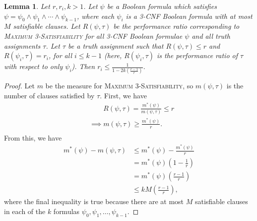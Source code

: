 \documentclass[]{article}
\theoremstyle{plain}
\newtheorem{lemma}{Lemma}
\theoremstyle{definition}
\begin{document}
\begin{lemma}\label{lem:bounds}
  Let $r, r_i, k > 1$.
  Let $\psi$ be a Boolean formula which satisfies $\psi = \psi_0 \land \psi_1 \land \dotsb \land \psi_{k - 1}$, where each $\psi_i$ is a 3-CNF Boolean formula with at most $M$ satisfiable clauses.
  Let $R(\psi, \tau)$ be the performance ratio corresponding to \textsc{Maximum 3-Satisfiability} for all 3-CNF Boolean formulae $\psi$ and all truth assignments $\tau$.
  Let $\tau$ be a truth assignment such that $R(\psi, \tau) \leq r$ and $R(\psi_i, \tau) = r_i$, for all $i \leq k - 1$ (here, $R(\psi_i, \tau)$ is the performance ratio of $\tau$ with respect to only $\psi_i$).
  Then $r_i \leq \frac{1}{1 - 2k\left(\frac{r - 1}{r}\right)}$.
\end{lemma}
\begin{proof}
  Let $m$ be the measure for \textsc{Maximum 3-Satisfiability}, so $m(\psi, \tau)$ is the number of clauses satisfied by $\tau$.
  First, we have
  \begin{align*}
    & \phantom{\implies} R(\psi, \tau) = \frac{m^*(\psi)}{m(\psi, \tau)} \leq r \\
    & \implies m(\psi, \tau) \geq \frac{m^*(\psi)}{r}. \\
  \end{align*}
  From this, we have
  \begin{align*}
    m^*(\psi) - m(\psi, \tau) & \leq m^*(\psi) - \frac{m^*(\psi)}{r} \\
    & = m^*(\psi) \left(1 - \frac{1}{r}\right) \\
    & = m^*(\psi) \left(\frac{r - 1}{r}\right)\\
    & \leq kM \left(\frac{r - 1}{r}\right),
  \end{align*}
  where the final inequality is true because there are at most $M$ satisfiable clauses in each of the $k$ formulas $\psi_0, \psi_1, \dotsc, \psi_{k - 1}$.


\end{proof}
\end{document}
